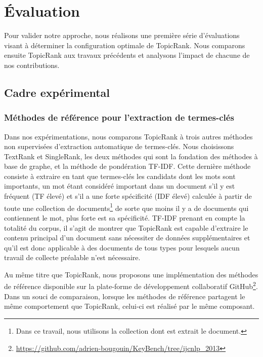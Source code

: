 \section{Évaluation}
\label{sec:evaluation}
  Pour valider notre approche, nous réalisons une première série d'évaluations
  visant à déterminer la configuration optimale de TopicRank. Nous comparons 
  ensuite Topic\-Rank aux travaux précédents et analysons l'impact de chacune de
  nos contributions.

  \subsection{Cadre expérimental}
  \label{subsec:cadre_experimental}
    \subsubsection{Méthodes de référence pour l'extraction de termes-clés}
    \label{subsubsec:systemes_de_reference_pour_l_extraction_de_termes_cles}
      Dans nos expérimentations, nous comparons TopicRank à trois autres
      méthodes non supervisées d'extraction automatique de termes-clés. Nous
      choisissons TextRank et SingleRank, les deux méthodes qui sont la
      fondation des méthodes à base de graphe, et la méthode de pondération
      TF-IDF. Cette dernière méthode consiste à extraire en tant que termes-clés
      les candidats dont les mots sont importants, un mot étant considéré
      important dans un document s'il y est fréquent (TF élevé) et s'il a une
      forte spécificité (IDF élevé) calculée à partir de toute une collection de
      documents\footnote{Dans ce travail, nous utilisons la collection dont est
      extrait le document.} de sorte que moins il y a de documents qui
      contiennent le mot, plus forte est sa spécificité. TF-IDF prenant en
      compte la totalité du corpus, il s'agit de montrer que TopicRank est
      capable d'extraire le contenu principal d'un document sans nécessiter de
      données supplémentaires et qu'il est donc applicable à des documents de
      tous types pour lesquels aucun travail de collecte préalable n'est
      nécessaire.

      Au même titre que TopicRank, nous proposons une implémentation des
      méthodes de référence disponible sur la plate-forme de développement
      collaboratif
      GitHub\footnote{\url{https://github.com/adrien-bougouin/KeyBench/tree/ijcnlp_2013}}.
      Dans un souci de comparaison, lorsque les méthodes de référence partagent
      le même comportement que TopicRank, celui-ci est réalisé par le même
      composant.

